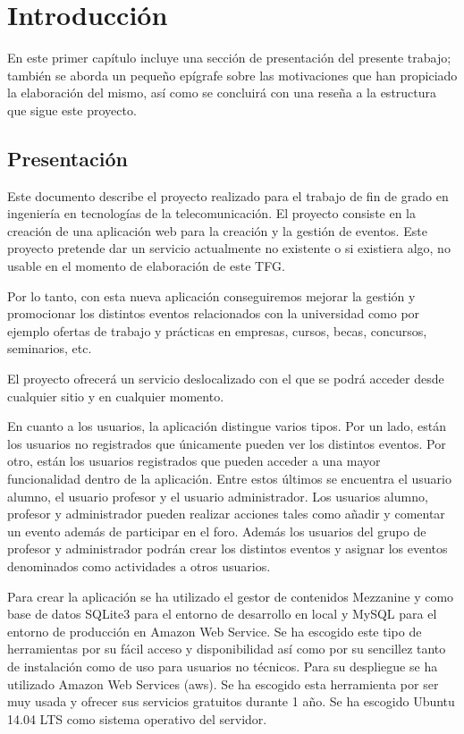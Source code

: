 \chapter{Introducción}
\label{sec:intro}

En este primer capítulo incluye una sección de presentación del presente trabajo; también se aborda un pequeño epígrafe sobre las motivaciones que han propiciado la elaboración del mismo, así como se concluirá con una reseña a la estructura que sigue este proyecto.


\section{Presentación}

Este documento describe el proyecto realizado para el trabajo de fin de grado en ingeniería en tecnologías de la telecomunicación. El proyecto consiste en la creación de una aplicación web para la creación y la gestión de eventos. Este proyecto pretende dar un servicio actualmente no existente o si existiera algo, no usable en el momento de elaboración de este TFG.


Por lo tanto, con esta nueva aplicación conseguiremos mejorar la gestión y promocionar los distintos eventos relacionados con la universidad como por ejemplo ofertas de trabajo y prácticas en empresas, cursos, becas, concursos, seminarios, etc.


El proyecto ofrecerá un servicio deslocalizado con el que se podrá acceder desde cualquier sitio y en cualquier  momento. 


En cuanto a los usuarios, la aplicación distingue varios tipos. Por un lado, están los usuarios no registrados que únicamente pueden ver los distintos eventos. Por otro, están los usuarios registrados que pueden acceder a una mayor funcionalidad dentro de la aplicación. Entre estos últimos se encuentra el usuario alumno, el usuario profesor y el usuario administrador. Los usuarios alumno, profesor y administrador pueden realizar acciones tales como añadir y comentar un evento además de participar en el foro. Además los usuarios del grupo de profesor y administrador podrán crear los distintos eventos y asignar los eventos denominados como actividades a otros usuarios.


Para crear la aplicación se ha utilizado el gestor de contenidos Mezzanine y como base de datos SQLite3 para el entorno de desarrollo en local y MySQL para el entorno de producción en Amazon Web Service. Se ha escogido este tipo de herramientas por su fácil acceso y disponibilidad así como por su sencillez tanto de instalación como de uso para usuarios no técnicos.
Para su despliegue se ha utilizado Amazon Web Services (aws). Se ha escogido esta herramienta por ser muy usada y ofrecer sus servicios gratuitos durante 1 año. Se ha escogido Ubuntu 14.04 LTS como sistema operativo del servidor.



